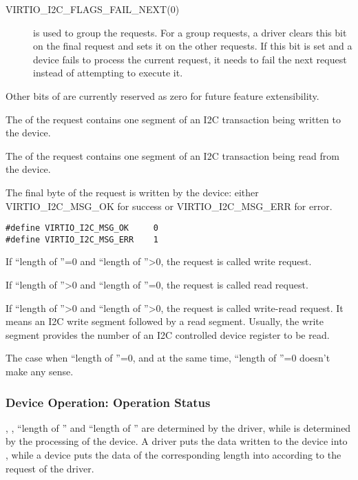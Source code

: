 \begin{description}
\item[VIRTIO_I2C_FLAGS_FAIL_NEXT(0)] is used to group the requests.
    For a group requests, a driver clears this bit on the final request
    and sets it on the other requests. If this bit is set and a device fails
    to process the current request, it needs to fail the next request instead
    of attempting to execute it.
\end{description}

Other bits of  are currently reserved as zero for future feature
extensibility.

The  of the request contains one segment of an I2C transaction
being written to the device.

The  of the request contains one segment of an I2C transaction
being read from the device.

The final  byte of the request is written by the device: either
VIRTIO_I2C_MSG_OK for success or VIRTIO_I2C_MSG_ERR for error.

\begin{lstlisting}
#define VIRTIO_I2C_MSG_OK     0
#define VIRTIO_I2C_MSG_ERR    1
\end{lstlisting}

If ``length of ''=0 and ``length of ''>0,
the request is called write request.

If ``length of ''>0 and ``length of ''=0,
the request is called read request.

If ``length of ''>0 and ``length of ''>0,
the request is called write-read request. It means an I2C write segment followed
by a read segment. Usually, the write segment provides the number of an I2C
controlled device register to be read.

The case when ``length of ''=0, and at the same time,
``length of ''=0 doesn't make any sense.

\subsubsection{Device Operation: Operation Status}\label{sec:Device Types / I2C Adapter Device / Device Operation: Operation Status}

, , ``length of '' and ``length of ''
are determined by the driver, while  is determined by the processing
of the device. A driver puts the data written to the device into , while
a device puts the data of the corresponding length into  according to the
request of the driver.

